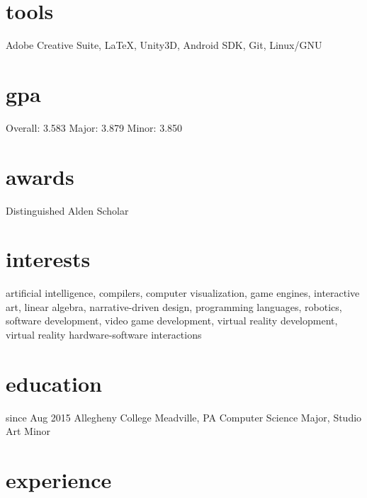 \documentclass[]{friggeri-cv}
\begin{document}
\begin{aside}
  \section{tools}\vspace{0.05cm}
    Adobe Creative Suite, \LaTeX , Unity3D, Android SDK, Git, Linux/GNU
  \section{gpa}\vspace{0.1cm}
  	Overall: 3.583
  	Major: 3.879
  	Minor: 3.850\vspace{0.1cm}
  \section{awards}\vspace{0.05cm}
    Distinguished Alden Scholar\vspace{0.1cm}
\end{aside}

\section{interests}

artificial intelligence, compilers, computer visualization, game engines, interactive art, linear algebra, narrative-driven design, programming languages, robotics, software development, video game development, virtual reality development, virtual reality hardware-software interactions

\section{education}
\begin{entrylist}
  \entry
    {since Aug 2015}
    {Allegheny College}
    {Meadville, PA}
    {Computer Science Major, Studio Art Minor}
\end{entrylist}

\section{experience}
\end{document}
